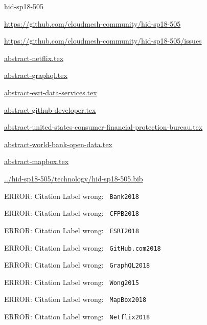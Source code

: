 \begin{IU}

hid-sp18-505

\url{https://github.com/cloudmesh-community/hid-sp18-505}

\url{https://github.com/cloudmesh-community/hid-sp18-505/issues}

\href{https://github.com/cloudmesh-community/hid-sp18-505/blob/master//technology/abstract-netflix.tex}{abstract-netflix.tex}

\href{https://github.com/cloudmesh-community/hid-sp18-505/blob/master//technology/abstract-graphql.tex}{abstract-graphql.tex}

\href{https://github.com/cloudmesh-community/hid-sp18-505/blob/master//technology/abstract-esri-data-services.tex}{abstract-esri-data-services.tex}

\href{https://github.com/cloudmesh-community/hid-sp18-505/blob/master//technology/abstract-github-developer.tex}{abstract-github-developer.tex}

\href{https://github.com/cloudmesh-community/hid-sp18-505/blob/master//technology/abstract-united-states-consumer-financial-protection-bureau.tex}{abstract-united-states-consumer-financial-protection-bureau.tex}

\href{https://github.com/cloudmesh-community/hid-sp18-505/blob/master//technology/abstract-world-bank-open-data.tex}{abstract-world-bank-open-data.tex}

\href{https://github.com/cloudmesh-community/hid-sp18-505/blob/master//technology/abstract-mapbox.tex}{abstract-mapbox.tex}

\href{https://github.com/cloudmesh-community/hid-sp18-505/blob/master//technology/hid-sp18-505.bib}{../hid-sp18-505/technology/hid-sp18-505.bib}

 ERROR: Citation Label wrong: \verb| Bank2018 |

 ERROR: Citation Label wrong: \verb| CFPB2018 |

 ERROR: Citation Label wrong: \verb| ESRI2018 |

 ERROR: Citation Label wrong: \verb| GitHub.com2018 |

 ERROR: Citation Label wrong: \verb| GraphQL2018 |

 ERROR: Citation Label wrong: \verb| Wong2015 |

 ERROR: Citation Label wrong: \verb| MapBox2018 |

 ERROR: Citation Label wrong: \verb| Netflix2018 |

\end{IU}


